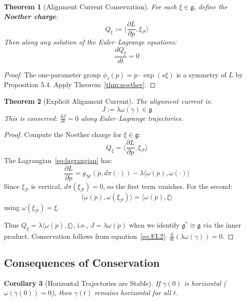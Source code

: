 \documentclass[11pt]{article}
\newtheorem{theorem}{Theorem}[section]
\newtheorem{corollary}[theorem]{Corollary}
\begin{document}
\begin{theorem}[Alignment Current Conservation]
\label{thm:alignment}
For each $\xi \in \mathfrak{g}$, define the \textbf{Noether charge}:
\[
Q_\xi := \langle \frac{\partial L}{\partial \dot{p}}, \xi_{\mathcal{P}} \rangle
\]
Then along any solution of the Euler--Lagrange equations:
\[
\frac{dQ_\xi}{dt} = 0
\]
\end{theorem}

\begin{proof}
The one-parameter group $\phi_s(p) = p \cdot \exp(s\xi)$ is a symmetry of $L$ by Proposition 5.4.
Apply Theorem~\ref{thm:noether}.
\end{proof}

\begin{theorem}[Explicit Alignment Current]
The alignment current is:
\begin{equation}
J := \lambda\omega(\dot{\gamma}) \in \mathfrak{g}
\label{eq:current}
\end{equation}
This is conserved: $\frac{dJ}{dt} = 0$ along Euler--Lagrange trajectories.
\end{theorem}

\begin{proof}
Compute the Noether charge for $\xi \in \mathfrak{g}$:
\[
Q_\xi = \langle \frac{\partial L}{\partial \dot{p}}, \xi_{\mathcal{P}} \rangle
\]
The Lagrangian~\eqref{eq:lagrangian} has:
\[
\frac{\partial L}{\partial \dot{p}} = g_{\mathcal{M}}(\check{p}, d\pi(\cdot)) - \lambda\langle\omega(\dot{p}), \omega(\cdot)\rangle
\]
Since $\xi_{\mathcal{P}}$ is vertical, $d\pi(\xi_{\mathcal{P}}) = 0$, so the first term vanishes. For the second:
\[
\langle\omega(\dot{p}), \omega(\xi_{\mathcal{P}})\rangle = \langle\omega(\dot{p}), \xi\rangle
\]
using $\omega(\xi_{\mathcal{P}}) = \xi$.

Thus $Q_\xi = \lambda\langle\omega(\dot{p}), \xi\rangle$, i.e., $J = \lambda\omega(\dot{p})$ when we identify $\mathfrak{g}^* \cong \mathfrak{g}$ via the inner product.
Conservation follows from equation~\eqref{eq:EL2}: $\frac{d}{dt}(\lambda\omega(\dot{\gamma})) = 0$.
\end{proof}

\subsection{Consequences of Conservation}

\begin{corollary}[Horizontal Trajectories are Stable]
If $\gamma(0)$ is horizontal ($\omega(\dot{\gamma}(0)) = 0$), then
$\gamma(t)$ remains horizontal for all $t$.
\end{corollary}
\end{document}
